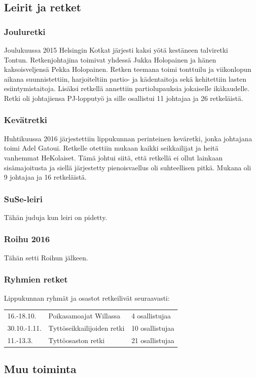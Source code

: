 \subsection{Leirit ja retket}
\subsubsection{Jouluretki}
Joulukuussa 2015 Helsingin Kotkat järjesti kaksi yötä kestäneen talviretki Tontun. Retkenjohtajina toimivat yhdessä Jukka Holopainen ja hänen kaksoisveljensä Pekka Holopainen. Retken teemana toimi tonttuilu ja viikonlopun aikana suunnistettiin, harjoiteltiin partio- ja kädentaitoja sekä kehitettiin lasten esiintymistaitoja. Lisäksi retkellä annettiin partiolupauksia jokaiselle ikäkaudelle. Retki oli johtajiensa PJ-lopputyö ja sille osallistui 11 johtajaa ja 26 retkeläistä.
\subsubsection{Kevätretki}
Huhtikuussa 2016 järjestettiin lippukunnan perinteinen keväretki, jonka johtajana toimi Adel Gatoui. Retkelle otettiin mukaan kaikki seikkailijat ja heitä vanhemmat HeKolaiset. Tämä johtui siitä, että retkellä ei ollut lainkaan sisämajoitusta ja siellä järjestetty pienoisvaellus oli suhteellisen pitkä. Mukana oli 9 johtajaa ja 16 retkeläistä.
\subsubsection{SuSe-leiri}
Tähän juduja kun leiri on pidetty.
\subsubsection{Roihu 2016}
Tähän setti Roihun jälkeen.
\subsubsection{Ryhmien retket}
Lippukunnan ryhmät ja osastot retkeilivät seuraavasti:
\begin{center}
	\begin{tabular}{l l l}
		16.-18.10. & Poikasamoajat Willassa & 4 osallistujaa\\
		30.10.-1.11. & Tyttöseikkailijoiden retki & 10 osallistujaa\\
		11.-13.3. & Tyttöosaston retki & 21 osallistujaa\\
	\end{tabular}
\end{center}
\subsection{Muu toiminta}
